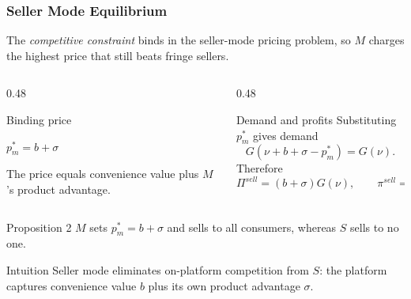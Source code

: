 \begin{frame}
  \frametitle{Seller Mode Equilibrium}
  \footnotesize
  The \textit{competitive constraint} binds in the seller-mode pricing problem,
  so $M$ charges the highest price that still beats fringe sellers.

  \begin{columns}[T,onlytextwidth]
    \begin{column}{0.48\textwidth}
      \begin{block}{Binding price}
        \begin{center}
          \hypertarget{seller_competitive_src}{%
            \hyperlink{seller_competitive_deriv}{%
              $\displaystyle p_m^*=b+\sigma$}}
        \end{center}
        The price equals convenience value plus $M$'s product advantage.
      \end{block}
    \end{column}

    \begin{column}{0.48\textwidth}
      \begin{block}{Demand and profits}
        Substituting $p_m^*$ gives demand
        \[
          G(\nu+b+\sigma-p_m^*)=G(\nu).
        \]
        Therefore
        \[
          \Pi^{sell}=(b+\sigma)G(\nu),
          \qquad
          \pi^{sell}=0.
        \]
      \end{block}
    \end{column}
  \end{columns}

  \begin{block}{Proposition 2}
    $M$ sets $p_m^*=b+\sigma$ and sells to all consumers, whereas $S$ sells to
    no one.
  \end{block}

  \begin{alertblock}{Intuition}
    Seller mode eliminates on-platform competition from $S$: the platform
    captures convenience value $b$ plus its own product advantage $\sigma$.
  \end{alertblock}
\end{frame}

